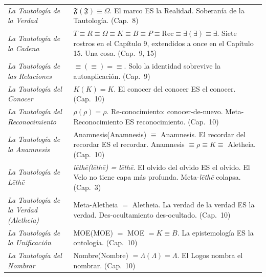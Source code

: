 \documentclass[10pt, openany, oneside]{book}
\renewcommand{\footnotesize}{\fontsize{8.5}{11}\selectfont}
\begin{document}
{\footnotesize
\noindent\begin{tabular}{@{} p{} @{\hspace{0.5em}} p{} @{}}

\textit{La Tautología de la Verdad} & $\mathfrak{F}(\mathfrak{F}) \equiv \Omega$. El marco ES la Realidad. Soberanía de la Tautología. (Cap.\ 8) \\[0.3em]

\textit{La Tautología de la Cadena} & $T \equiv R \equiv \Omega \equiv K \equiv B \equiv P \equiv \text{Rec} \equiv \exists(\exists) \equiv \exists$. Siete rostros en el Capítulo 9, extendidos a once en el Capítulo 15. Una cosa. (Cap.\ 9, 15) \\[0.3em]

\textit{La Tautología de las Relaciones} & $\equiv(\equiv) = \equiv$. Solo la identidad sobrevive la autoaplicación. (Cap.\ 9) \\[0.3em]

\textit{La Tautología del Conocer} & $K(K) = K$. El conocer del conocer ES el conocer. (Cap.\ 10) \\[0.3em]

\textit{La Tautología del Reconocimiento} & $\rho(\rho) = \rho$. Re-conocimiento: conocer-de-nuevo. Meta-Reconocimiento ES reconocimiento. (Cap.\ 10) \\[0.3em]

\textit{La Tautología de la Anamnesis} & Anamnesis(Anamnesis) $\equiv$ Anamnesis. El recordar del recordar ES el recordar. Anamnesis $\equiv \rho \equiv K \equiv$ Aletheia. (Cap.\ 10) \\[0.3em]

\textit{La Tautología de L\={e}th\={e}} & \textit{l\={e}th\={e}(l\={e}th\={e}) = l\={e}th\={e}}. El olvido del olvido ES el olvido. El Velo no tiene capa más profunda. Meta-\textit{l\={e}th\={e}} colapsa. (Cap.\ 3) \\[0.3em]

\textit{La Tautología de la Verdad (\textit{Aletheia})} & Meta-Aletheia $=$ Aletheia. La verdad de la verdad ES la verdad. Des-ocultamiento des-ocultado. (Cap.\ 10) \\[0.3em]

\textit{La Tautología de la Unificación} & MOE(MOE) $=$ MOE $= K \equiv B$. La epistemología ES la ontología. (Cap.\ 10) \\[0.3em]

\textit{La Tautología del Nombrar} & Nombre(Nombre) $= \Lambda(\Lambda) = \Lambda$. El Logos nombra el nombrar. (Cap.\ 10) \\[0.3em]


\end{tabular}}
\end{document}
